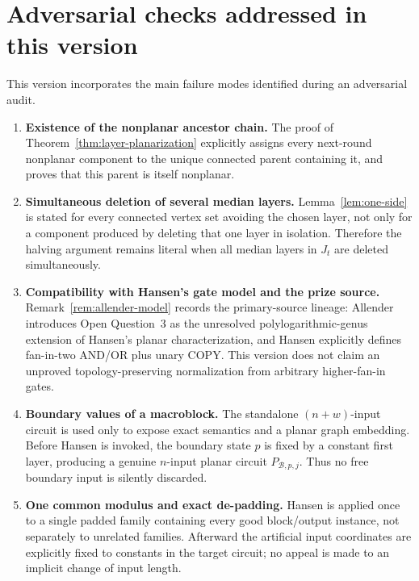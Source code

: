\documentclass[11pt]{article}
\theoremstyle{definition}
\newcommand{\cB}{\mathcal{B}}
\begin{document}
\section{Adversarial checks addressed in this version}\label{sec:audit}

This version incorporates the main failure modes identified during an
adversarial audit.

\begin{enumerate}[leftmargin=2.2em]
  \item \textbf{Existence of the nonplanar ancestor chain.}
  The proof of Theorem~\ref{thm:layer-planarization} explicitly assigns every
  next-round nonplanar component to the unique connected parent containing it,
  and proves that this parent is itself nonplanar.

  \item \textbf{Simultaneous deletion of several median layers.}
  Lemma~\ref{lem:one-side} is stated for every connected vertex set avoiding
  the chosen layer, not only for a component produced by deleting that one
  layer in isolation.  Therefore the halving argument remains literal when all
  median layers in $J_t$ are deleted simultaneously.

  \item \textbf{Compatibility with Hansen's gate model and the prize source.}
  Remark~\ref{rem:allender-model} records the primary-source lineage: Allender
  introduces Open Question~3 as the unresolved polylogarithmic-genus extension
  of Hansen's planar characterization, and Hansen explicitly defines fan-in-two
  AND/OR plus unary COPY.  This version does not claim an unproved
  topology-preserving normalization from arbitrary higher-fan-in gates.

  \item \textbf{Boundary values of a macroblock.}
  The standalone $(n+w)$-input circuit is used only to expose exact semantics
  and a planar graph embedding.  Before Hansen is invoked, the boundary state
  $p$ is fixed by a constant first layer, producing a genuine $n$-input planar
  circuit $P_{\cB,p,j}$.  Thus no free boundary input is silently discarded.

  \item \textbf{One common modulus and exact de-padding.}
  Hansen is applied once to a single padded family containing every good
  block/output instance, not separately to unrelated families.  Afterward the
  artificial input coordinates are explicitly fixed to constants in the
  target circuit; no appeal is made to an implicit change of input length.


\end{enumerate}
\end{document}
